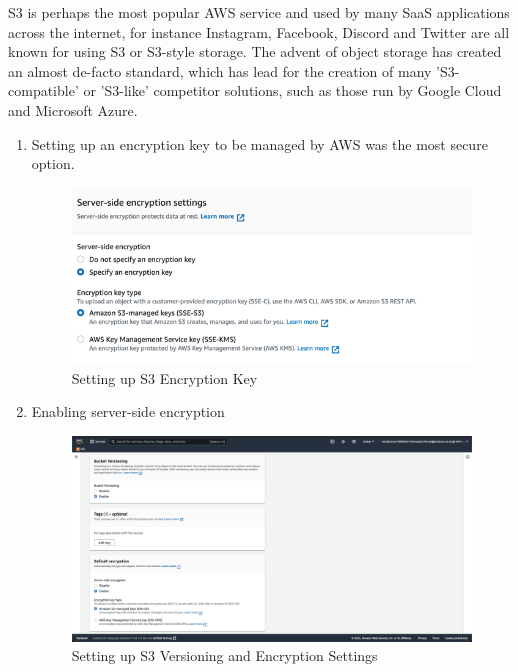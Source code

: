 S3 is perhaps the most popular AWS service and used by many SaaS applications across the internet, for instance
Instagram, Facebook, Discord and Twitter are all known for using S3 or S3-style storage.
The advent of object storage has created an almost de-facto standard, which has lead for the creation of many
'S3-compatible' or 'S3-like' competitor solutions, such as those run by Google Cloud and Microsoft Azure.
\pagebreak
\begin{enumerate}
    \section{Creating an S3 Bucket}

        \item Setting up an encryption key to be managed by AWS was the most secure option.\nolinebreak
            \begin{figure}[H]
                \centering
                \includegraphics[width=\textwidth]{resources/s3/s3_encryption.PNG}
                \caption{Setting up S3 Encryption Key}
                \label{fig:s3-image-2}
            \end{figure}


    \item Enabling server-side encryption\nolinebreak
        \begin{figure}[H]
            \centering
            \includegraphics[width=\textwidth]{resources/s3/s3-versioning-encrypting.png}
            \caption{Setting up S3 Versioning and Encryption Settings}
            \label{fig:s3-versioning-encrypting}
        \end{figure}


\end{enumerate}
